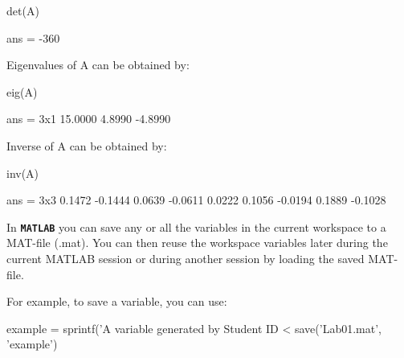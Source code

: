 \documentclass{article}
\begin{document}
\begin{matlabcode}
det(A)
\end{matlabcode}
\begin{matlaboutput}
ans = -360
\end{matlaboutput}


\begin{par}
\begin{flushleft}
Eigenvalues of A can be obtained by:
\end{flushleft}
\end{par}

\begin{matlabcode}
eig(A)
\end{matlabcode}
\begin{matlaboutput}
ans = 3x1    
   15.0000
    4.8990
   -4.8990

\end{matlaboutput}


\begin{par}
\begin{flushleft}
Inverse of A can be obtained by:
\end{flushleft}
\end{par}

\begin{matlabcode}
inv(A)
\end{matlabcode}
\begin{matlaboutput}
ans = 3x3    
    0.1472   -0.1444    0.0639
   -0.0611    0.0222    0.1056
   -0.0194    0.1889   -0.1028

\end{matlaboutput}



\begin{par}
\begin{flushleft}
In \texttt{\textbf{MATLAB}} you can save any or all the variables in the current workspace to a MAT-file (.mat). You can then reuse the workspace variables later during the current MATLAB session or during another session by loading the saved MAT-file.
\end{flushleft}
\end{par}

\begin{par}
\begin{flushleft}
For example, to save a variable, you can use:
\end{flushleft}
\end{par}

\begin{matlabcode}
example = sprintf('A variable generated by Student ID <%
save('Lab01.mat', 'example')
\end{matlabcode}
\end{document}
